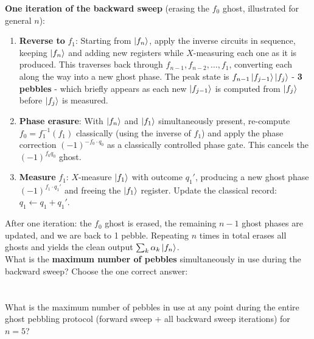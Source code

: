 \textbf{One iteration of the backward sweep} (erasing the $f_0$ ghost, illustrated for general $n$):
\begin{enumerate}
    \item \textbf{Reverse to} $f_1$: Starting from $\ket{f_n}$, apply the inverse circuits in sequence, keeping $\ket{f_n}$ and adding new registers while $X$-measuring each one as it is produced. This traverses back through $f_{n-1},f_{n-2},\ldots,f_1$, converting each along the way into a new ghost phase. The peak state is $f_{n-1}\ket{f_{j-1}} \ket{f_j}$ - \textbf{3 pebbles} - which briefly appears as each new $\ket{f_{j-1}}$ is computed from $\ket{f_j}$ before $\ket{f_j}$ is measured.
    \item \textbf{Phase erasure}: With $\ket{f_n}$ and $\ket{f_1}$ simultaneously present, re-compute $f_0 = f_1^{-1}(f_1)$ classically (using the inverse of $f_1$) and apply the phase correction $(-1)^{-f_0\cdot q_0}$  as a classically controlled phase gate. This cancels the $(-1)^{f_0q_0}$ ghost.
    \item \textbf{Measure} $f_1$: $X$-measure $\ket{f_1}$ with outcome $q_1'$, producing a new ghost phase $(-1)^{f_1\cdot q_1 '}$ and freeing the $\ket{f_1}$ register. Update the classical record: $q_1 \leftarrow q_1 + q_1'$.
\end{enumerate}
After one iteration: the $f_0$ ghost is erased, the remaining $n-1$ ghost phases are updated, and we are back to 1 pebble. Repeating $n$ times in total erases all ghosts and yields the clean output $\sum_k \alpha_k \ket{f_n}$.\\


What is the \textbf{maximum number of pebbles} simultaneously in use during the backward sweep? Choose the one correct answer: \\
\noindent{}
\newline \\\\
What is the maximum number of pebbles in use at any point during the entire ghost pebbling protocol (forward sweep + all backward sweep iterations) for $n=5$? \\
\noindent{}


